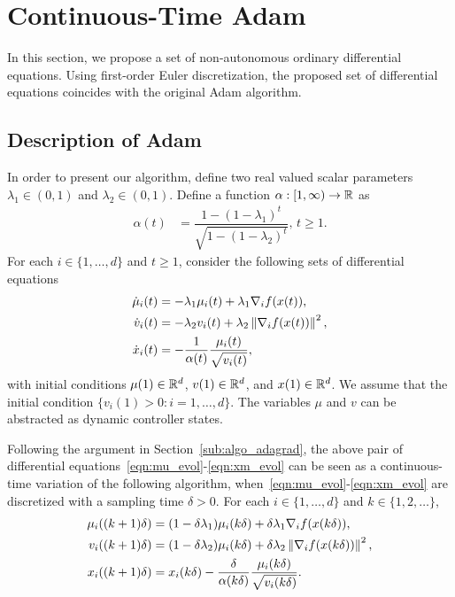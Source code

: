 \section{Continuous-Time Adam}
\label{sec:adam}

In this section, we propose a set of non-autonomous ordinary differential equations. Using first-order Euler discretization, the proposed set of differential equations coincides with the original Adam algorithm. 

\subsection{Description of Adam}
\label{sub:algo_adam}

In order to present our algorithm, define two real valued scalar parameters $\lambda_1 \in (0,1)$ and $\lambda_2 \in (0,1)$.
Define a function $\alpha: [1,\infty) \to \mathbb{R}$ as
\begin{align}
    \alpha(t) &= \dfrac{1-(1-\lambda_1)^t}{\sqrt{1-(1-\lambda_2)^t}}, \, t\geq 1. \label{eqn:alpha}
\end{align}
For each $i \in \{1,\ldots,d\}$ and $t \geq 1$, consider the following sets of differential equations
\begin{align}
    \Dot{\mu}_i(t) & = -\lambda_1 \mu_i(t) + \lambda_1 \nabla_i f(x(t)), \label{eqn:mu_evol} \\
    \Dot{v}_i(t) & = -\lambda_2 v_i(t) + \lambda_2 \left\lVert\nabla_i f(x(t))\right\rVert ^2, \label{eqn:v_evol} \\
    \Dot{x}_i(t) & = - \dfrac{1}{\alpha(t)} \dfrac{\mu_i(t)}{\sqrt{v_i(t)}}, \label{eqn:xm_evol}
\end{align}
with initial conditions $\mu(1) \in \mathbb{R}^d$, $v(1) \in \mathbb{R}^d$, and $x(1) \in \mathbb{R}^d$. We assume that the initial condition $\{v_i(1) > 0 : i = 1,\ldots,d\}$. The variables $\mu$ and $v$ can be abstracted as dynamic controller states. 

Following the argument in Section~\ref{sub:algo_adagrad}, the above pair of differential equations~\eqref{eqn:mu_evol}-\eqref{eqn:xm_evol} can be seen as a continuous-time variation of the following algorithm, when~\eqref{eqn:mu_evol}-\eqref{eqn:xm_evol} are discretized with a sampling time $\delta > 0$. For each $i \in \{1,\ldots,d\}$ and $k \in \{1,2,\ldots\}$,
\begin{align}
    \mu_i((k+1)\delta) & = (1-\delta \lambda_1) \mu_i(k\delta) + \delta \lambda_1 \nabla_i f(x(k\delta)), \label{eqn:mu_dscrt}\\
    v_i((k+1)\delta) & = (1-\delta \lambda_2) \mu_i(k\delta) + \delta \lambda_2 \left\lVert\nabla_i f(x(k\delta))\right\rVert ^2, \label{eqn:v_dscrt}\\
    x_{i}((k+1)\delta) & = x_{i}(k\delta) - \dfrac{\delta}{\alpha(k\delta)} \dfrac{\mu_i(k\delta)}{\sqrt{v_i(k\delta)}}.  \label{eqn:xm_dscrt}
\end{align}

